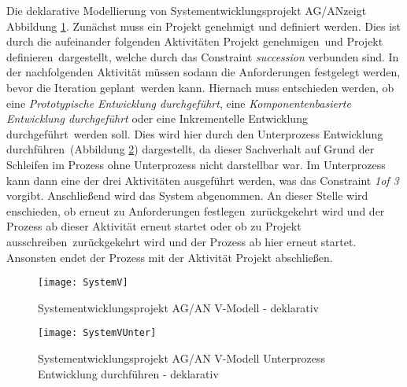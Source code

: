 {Die deklarative Modellierung von \grqq Systementwicklungsprojekt AG/AN\grqq  zeigt Abbildung \ref{fig:SystemV}. \newline
Zunächst muss ein Projekt genehmigt und definiert werden. Dies ist durch die aufeinander folgenden Aktivitäten \grqq Projekt genehmigen\grqq \ und \grqq Projekt definieren\grqq \ dargestellt, welche durch das Constraint \textit{succession} verbunden sind.\newline
In der nachfolgenden Aktivität müssen sodann die \grqq Anforderungen festgelegt werden\grqq, bevor die \grqq Iteration geplant\grqq \ werden kann. \newline
Hiernach muss entschieden werden, ob eine \textit{Prototypische Entwicklung durchgeführt}, eine \textit{Komponentenbasierte Entwicklung durchgeführt} oder eine \grqq Inkrementelle Entwicklung durchgeführt\grqq \ werden soll. Dies wird hier durch den Unterprozess \grqq Entwicklung durchführen\grqq \ (Abbildung \ref{fig:SystemVUnter}) dargestellt, da dieser Sachverhalt auf Grund der Schleifen im Prozess ohne Unterprozess nicht darstellbar war. Im Unterprozess kann dann eine der drei Aktivitäten ausgeführt werden, was das Constraint \textit{1of 3} vorgibt.\newline
Anschließend wird das \grqq System abgenommen\grqq.
An dieser Stelle wird enschieden, ob erneut zu \grqq Anforderungen festlegen\grqq \ zurückgekehrt wird und der Prozess ab dieser Aktivität erneut startet oder ob zu \grqq Projekt ausschreiben\grqq \ zurückgekehrt wird und der Prozess ab hier erneut startet. Ansonsten endet der Prozess mit der Aktivität \grqq Projekt abschließen\grqq.

\begin{figure}[!htbp]
\begin{center}
  \texttt{[image: SystemV]} %
  \caption{Systementwicklungsprojekt AG/AN  V-Modell - deklarativ}
  \label{fig:SystemV}
\end{center}
\end{figure}

\begin{figure}[!htbp]
\begin{center}
  \texttt{[image: SystemVUnter]} %
  \caption{Systementwicklungsprojekt AG/AN  V-Modell Unterprozess Entwicklung durchführen - deklarativ}
  \label{fig:SystemVUnter}
\end{center}
\end{figure}



}

